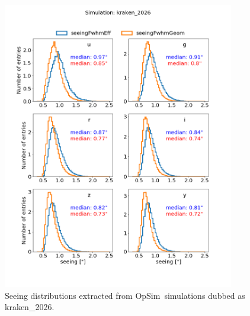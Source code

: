 \documentclass[\docopts]{\docclass}
\newcommand{\opsim}{{\sc OpSim}}
\begin{document}
\begin{figure}[htbp]
\begin{center}
  \includegraphics[width=0.9\textwidth]{seeing_kraken_2026.png}
 \caption{Seeing distributions extracted from \opsim~simulations dubbed as kraken\_2026.}\label{fig:seeing_opsim}
\end{center}
\end{figure}
\end{document}
